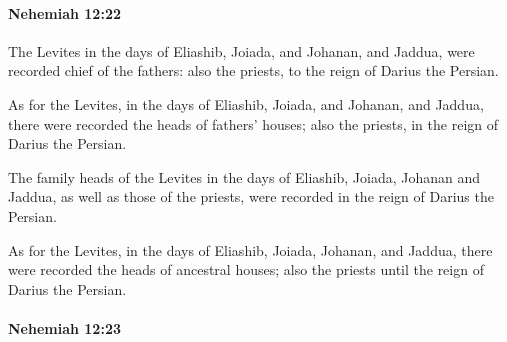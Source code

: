 		\paragraph{Nehemiah 12:22} %
			\label{NEHEMIAH-12-22}

			The Levites in the days of Eliashib, Joiada, and Johanan, and Jaddua, were recorded chief of the fathers: also the priests, to the reign of Darius the Persian.

			\begin{versebox}
					\item[BHS] 
					\item[LXX] 
					\item[ASV] As for the Levites, in the days of Eliashib, Joiada, and Johanan, and Jaddua, there were recorded the heads of fathers' houses; also the priests, in the reign of Darius the Persian.
					\item[NIV] The family heads of the Levites in the days of Eliashib, Joiada, Johanan and Jaddua, as well as those of the priests, were recorded in the reign of Darius the Persian.
					\item[NRSV] As for the Levites, in the days of Eliashib, Joiada, Johanan, and Jaddua, there were recorded the heads of ancestral houses; also the priests until the reign of Darius the Persian.
			\end{versebox}

		\paragraph{Nehemiah 12:23} %
			\label{NEHEMIAH-12-23}

